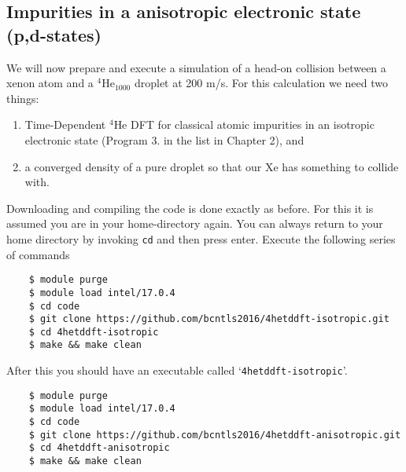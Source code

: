 \documentclass[10pt,a4paper]{article}
\begin{document}
	\subsection{Impurities in a anisotropic electronic state (p,d-states)}
	
		We will now prepare and execute a simulation of a head-on collision between a xenon atom and a $^4$He$_{1000}$ droplet at 200 m/s. For this calculation we need two things:
	\begin{enumerate}
		\item Time-Dependent $^4$He DFT for classical atomic impurities in an isotropic electronic state (Program 3. in the list in Chapter 2), and
		\item a converged density of a pure droplet so that our Xe has something to collide with. 
	\end{enumerate}
	Downloading and compiling the code is done exactly as before. For this it is assumed you are in your home-directory again. You can always return to your home directory by invoking \verb|cd| and then press enter. Execute the following series of commands
	\begin{verbatim}
	$ module purge
	$ module load intel/17.0.4
	$ cd code
	$ git clone https://github.com/bcntls2016/4hetddft-isotropic.git
	$ cd 4hetddft-isotropic
	$ make && make clean
	\end{verbatim}
	After this you should have an executable called `\verb|4hetddft-isotropic|'. 
	
	
	\begin{verbatim}
	$ module purge
	$ module load intel/17.0.4
	$ cd code
	$ git clone https://github.com/bcntls2016/4hetddft-anisotropic.git
	$ cd 4hetddft-anisotropic
	$ make && make clean
	\end{verbatim}
	
\end{document}
